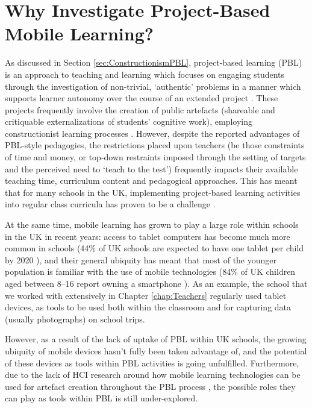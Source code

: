 \section{Why Investigate Project-Based Mobile Learning?}
As discussed in Section \ref{sec:ConstructionismPBL}, project-based learning (PBL) is an approach to teaching and learning which focuses on engaging students through the investigation of non-trivial, `authentic' problems in a manner which supports learner autonomy over the course of an extended project \citep{Blumenfeld1991}. These projects frequently involve the creation of public artefacts (shareable and critiquable externalizations of students' cognitive work), employing constructionist learning processes \citep{PapertSeymourandHarel1991a, Holubova2008}. However, despite the reported advantages of PBL-style pedagogies, the restrictions placed upon teachers (be those constraints of time and money, or top-down restraints imposed through the setting of targets and the perceived need to `teach to the test') frequently impacts their available teaching time, curriculum content and pedagogical approaches. This has meant that for many schools in the UK, implementing project-based learning activities into regular class curricula has proven to be a challenge \citep{TheEducationEndowmentFoundation2016}.

At the same time, mobile learning has grown to play a large role within schools in the UK in recent years: access to tablet computers has become much more common in schools (44\% of UK schools are expected to have one tablet per child by 2020 \citep{BritishEducationalSuppliersAssociation2015}), and their general ubiquity has meant that most of the younger population is familiar with the use of mobile technologies (84\% of UK children aged between 8--16 report owning a smartphone \citep{Statistica2018a}). As an example, the school that we worked with extensively in Chapter \ref{chap:Teachers} regularly used tablet devices, as tools to be used both within the classroom and for capturing data (usually photographs) on school trips.

However, as a result of the lack of uptake of PBL within UK schools, the growing ubiquity of mobile devices hasn't fully been taken advantage of, and the potential of these devices as tools within PBL activities is going unfulfilled. Furthermore, due to the lack of HCI research around how mobile learning technologies can be used for artefact creation throughout the PBL process \citep{Chan2015}, the possible roles they can play as tools within PBL is still under-explored.



